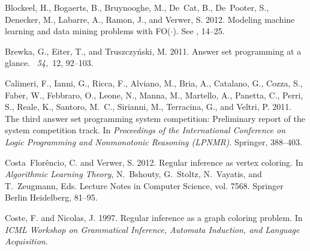 \documentclass{tlp}
\newcommand{\fodot}{{\sc FO($\cdot$)}\xspace}
\renewcommand{\|}{\ensuremath{\,|\,}}
\renewcommand{\|}{\,|\,}
\begin{document}
\begin{thebibliography}{}
{\sc Blockeel, H.}, {\sc Bogaerts, B.}, {\sc Bruynooghe, M.}, {\sc De~Cat, B.},
  {\sc De~Pooter, S.}, {\sc Denecker, M.}, {\sc Labarre, A.}, {\sc Ramon, J.},
  {\sc and} {\sc Verwer, S.} 2012.
\newblock Modeling machine learning and data mining problems with \fodot.
\newblock See , 14--25.

{\sc Brewka, G.}, {\sc Eiter, T.}, {\sc and} {\sc Truszczy{\'n}ski, M.} 2011.
\newblock Answer set programming at a glance.
~{\em 54,\/}~12, 92--103.

{\sc Calimeri, F.}, {\sc Ianni, G.}, {\sc Ricca, F.}, {\sc Alviano, M.}, {\sc
  Bria, A.}, {\sc Catalano, G.}, {\sc Cozza, S.}, {\sc Faber, W.}, {\sc
  Febbraro, O.}, {\sc Leone, N.}, {\sc Manna, M.}, {\sc Martello, A.}, {\sc
  Panetta, C.}, {\sc Perri, S.}, {\sc Reale, K.}, {\sc Santoro, M.~C.}, {\sc
  Sirianni, M.}, {\sc Terracina, G.}, {\sc and} {\sc Veltri, P.} 2011.
\newblock The third answer set programming system competition: Preliminary
  report of the system competition track.
\newblock In {\em Proceedings of the International Conference on Logic
  Programming and Nonmonotonic Reasoning ({LPNMR})}. Springer, 388--403.

{\sc Costa~Flor\^encio, C.} {\sc and} {\sc Verwer, S.} 2012.
\newblock Regular inference as vertex coloring.
\newblock In {\em Algorithmic Learning Theory}, {N.~Bshouty}, {G.~Stoltz},
  {N.~Vayatis}, {and} {T.~Zeugmann}, Eds. Lecture Notes in Computer Science,
  vol. 7568. Springer Berlin Heidelberg, 81--95.

{\sc Coste, F.} {\sc and} {\sc Nicolas, J.} 1997.
\newblock Regular inference as a graph coloring problem.
\newblock In {\em ICML Workshop on Grammatical Inference, Automata Induction,
  and Language Acquisition}.


\end{thebibliography}
\end{document}

